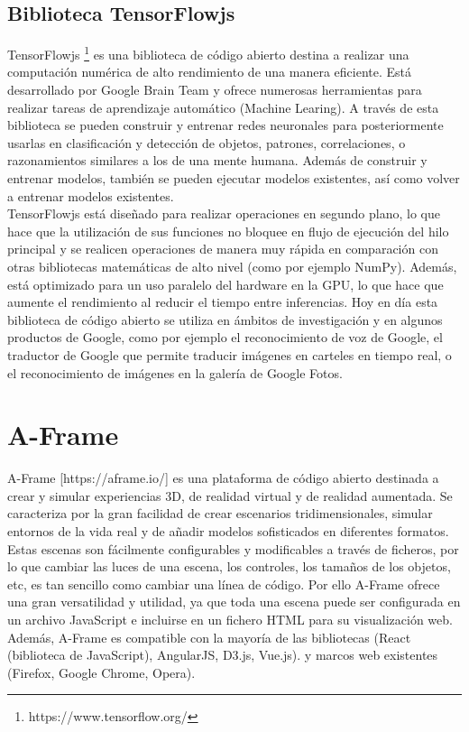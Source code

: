 \documentclass{report}
\begin{document}
\newpage
\subsection{Biblioteca TensorFlowjs}
TensorFlowjs \footnote{https://www.tensorflow.org/} es una biblioteca de código abierto destina a realizar una computación numérica de alto rendimiento de una manera eficiente. Está desarrollado por Google Brain Team y ofrece numerosas herramientas para realizar tareas de aprendizaje automático (Machine Learing). A través de esta biblioteca se pueden construir y entrenar redes neuronales para posteriormente usarlas en clasificación y detección de objetos, patrones, correlaciones, o razonamientos similares a los de una mente humana. Además de construir y entrenar modelos, también se pueden ejecutar modelos existentes, así como volver a entrenar modelos existentes. 
\\

TensorFlowjs está diseñado para realizar operaciones en segundo plano, lo que hace que la utilización de sus funciones no bloquee en flujo de ejecución del hilo principal y se realicen operaciones de manera muy rápida en comparación con otras bibliotecas matemáticas de alto nivel (como por ejemplo NumPy). Además, está optimizado para un uso paralelo del hardware en la GPU, lo que hace que aumente el rendimiento al reducir el tiempo entre inferencias. Hoy en día esta biblioteca de código abierto se utiliza en ámbitos de investigación y en algunos productos de Google, como por ejemplo el reconocimiento de voz de Google, el traductor de Google que permite traducir imágenes en carteles en tiempo real, o el reconocimiento de imágenes en la galería de Google Fotos.

\section{A-Frame}
A-Frame [https://aframe.io/] es una plataforma de código abierto destinada a crear y simular experiencias 3D, de realidad virtual y de realidad aumentada. Se caracteriza por la gran facilidad de crear escenarios tridimensionales, simular entornos de la vida real y de añadir modelos sofisticados en diferentes formatos. Estas escenas son fácilmente configurables y modificables a través de ficheros, por lo que cambiar las luces de  una escena, los controles, los tamaños de los objetos, etc, es tan sencillo como cambiar una línea de código. Por ello A-Frame ofrece una gran versatilidad y utilidad, ya que toda una escena puede ser configurada en un archivo JavaScript e incluirse en un fichero HTML para su visualización web. Además, A-Frame es compatible con la mayoría de las bibliotecas (React (biblioteca de JavaScript), AngularJS, D3.js, Vue.js).  y marcos web existentes (Firefox, Google Chrome, Opera). 
\\
\end{document}
